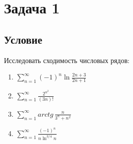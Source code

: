 \documentclass[12pt]{article}
\begin{document}
	\section*{Задача 1}	
	\subsection*{Условие}
	
	Исследовать сходимость числовых рядов:  

	\begin{enumerate}
		\item $ \sum_{n=1}^{\infty} (-1)^n \ln{\frac{2n + 3}{2n + 1}} $
		\item $ \sum_{n=1}^{\infty} \frac{2^{n^2}}{(3n)!} $
		\item $ \sum_{n=1}^{\infty} arctg \, \frac{n}{3^n + n^2} $
		\item $ \sum_{n=1}^{\infty} \frac{(-1)^n}{n \ln^{3/4} n} $
	\end{enumerate}
\end{document}
